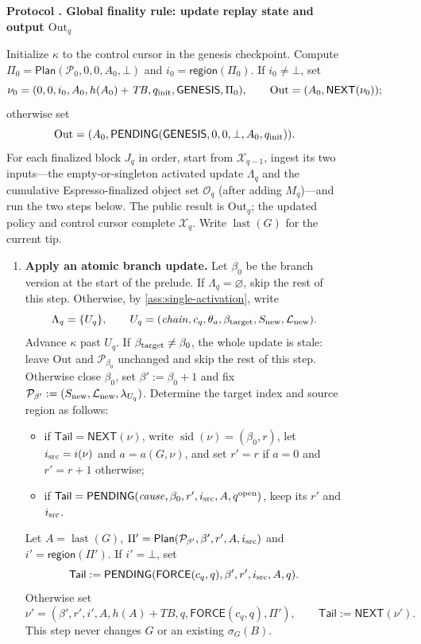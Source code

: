 \documentclass[11pt,a4paper]{article}
\newcommand{\TB}{\mathit{TB}}
\newcommand{\tagg}[1]{\ensuremath{\mathsf{#1}}}
\newcounter{protocol}
\newenvironment{protocol}[3][htbp]{\begin{figure}[#1]\refstepcounter{protocol}\label{#2}
\begin{mdframed}[linewidth=.6pt,skipabove=0pt,skipbelow=0pt,
innertopmargin=7pt,innerbottommargin=7pt]\small
\textbf{Protocol \theprotocol. #3}\par\smallskip}{\end{mdframed}\end{figure}}
\begin{document}
\begin{protocol}[H]{alg:global-rule}{Global finality rule: update replay state and output $\mathrm{Out}_q$}
Initialize $\kappa$ to the control cursor in the genesis checkpoint. Compute
$\Pi_0=\tagg{Plan}(\mathcal P_0,0,0,A_0,\bot)$ and
$i_0=\tagg{region}(\Pi_0)$.  If $i_0\ne\bot$, set
\[
 \nu_0=(0,0,i_0,A_0,h(A_0)+\TB,q_{\rm init},\tagg{GENESIS},\Pi_0),
 \qquad \mathrm{Out}=(A_0,\tagg{NEXT}(\nu_0));
\]
otherwise set
\[
 \mathrm{Out}=(A_0,
 \tagg{PENDING}(\tagg{GENESIS},0,0,\bot,A_0,q_{\rm init})).
\]
For each finalized block $J_q$ in order, start from $\mathcal X_{q-1}$,
ingest its two inputs---the empty-or-singleton activated update
$\Lambda_q$ and the cumulative
Espresso-finalized object set $\mathcal O_q$ (after adding $M_q$)---and
run the two steps below. The public result is $\mathrm{Out}_q$; the
updated policy and control cursor complete $\mathcal X_q$. Write
$\operatorname{last}(G)$ for the current tip.
\begin{enumerate}[label=\textbf{\arabic*)},itemsep=3pt]
\item \textbf{Apply an atomic branch update.}
Let $\beta_0$ be the branch version at the start of the prelude. If
$\Lambda_q=\varnothing$, skip the rest of this step. Otherwise, by
\cref{ass:single-activation}, write
\[
 \Lambda_q=\{U_q\},\qquad
 U_q=(\mathit{chain},c_q,\theta_a,\beta_{\rm target},S_{\rm new},
      \mathcal L_{\rm new}).
\]
Advance $\kappa$ past $U_q$. If $\beta_{\rm target}\ne\beta_0$, the
whole update is stale: leave $\mathrm{Out}$ and $\mathcal P_{\beta_0}$
unchanged and skip the rest of this step. Otherwise close $\beta_0$, set
$\beta':=\beta_0+1$ and fix
$\mathcal P_{\beta'}:=(S_{\rm new},\mathcal L_{\rm new},\lambda_{U_q})$.
Determine the target index and source region as follows:
  \begin{itemize}[itemsep=1pt]
  \item if $\mathsf{Tail}=\tagg{NEXT}(\nu)$, write
  $\operatorname{sid}(\nu)=(\beta_0,r)$, let $i_{\rm src}=i(\nu)$ and
  $a=a(G,\nu)$, and set $r'=r$ if $a=0$ and $r'=r+1$ otherwise;
  \item if $\mathsf{Tail}=\tagg{PENDING}
  (\mathit{cause},\beta_0,r',i_{\rm src},A,q^{\rm open})$, keep its $r'$ and
  $i_{\rm src}$.
  \end{itemize}
Let $A=\operatorname{last}(G)$,
$\Pi'=\tagg{Plan}(\mathcal P_{\beta'},\beta',r',A,i_{\rm src})$
and $i'=\tagg{region}(\Pi')$.  If $i'=\bot$, set
\[
 \mathsf{Tail}:=\tagg{PENDING}
 (\tagg{FORCE}(c_q,q),\beta',r',i_{\rm src},A,q).
\]
Otherwise set
\[
 \nu'=(\beta',r',i',A,h(A)+\TB,q,
       \tagg{FORCE}(c_q,q),\Pi'),
 \qquad \mathsf{Tail}:=\tagg{NEXT}(\nu').
\]
This step never changes $G$ or an existing $\sigma_G(B)$.


\end{enumerate}
\end{protocol}
\end{document}
